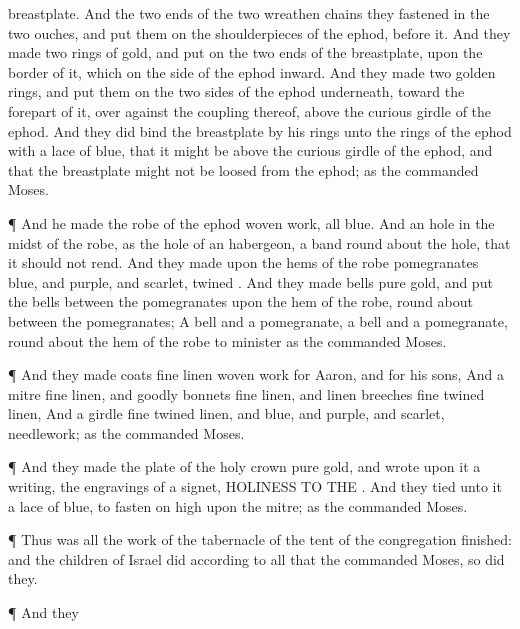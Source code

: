 {breastplate.
And the
two
ends of the
two
wreathen
chains they
fastened in the
two
ouches, and
put them on the
shoulderpieces of the
ephod,
before
it.
And they
made
two
rings of
gold, and
put
{} on the
two
ends of the
breastplate, upon the
border of it, which
{} on the
side of the
ephod
inward.
And they
made
two
{}
golden
rings, and
put them on the
two
sides of the
ephod
underneath,
toward the
forepart of it, over
against the
{}
coupling thereof,
above the curious
girdle of the
ephod.
And they did
bind the
breastplate by his
rings unto the
rings of the
ephod with a
lace of
blue, that it might be above the curious
girdle of the
ephod, and that the
breastplate might not be
loosed from the
ephod; as the
{}
commanded
Moses.
\par }{\PP {}¶ And he
made the
robe of the
ephod
{}
woven
work,
all
{}
blue.
And
{} an
hole in the
midst of the
robe, as the
hole of an
habergeon,
{} a
band round
about the
hole, that it should not
rend.
And they
made upon the
hems of the
robe
pomegranates
{}
blue, and
purple, and
scarlet,
{}
twined
{}.
And they
made
bells
{}
pure
gold, and
put the
bells
between the
pomegranates upon the
hem of the
robe, round
about
between the
pomegranates;
A
bell and a
pomegranate, a
bell and a
pomegranate, round
about the
hem of the
robe to
minister
{} as the
{}
commanded
Moses.
\par }{\PP {}¶ And they
made
coats
{} fine
linen
{}
woven
work for
Aaron, and for his
sons,
And a
mitre
{} fine
linen, and
goodly
bonnets
{} fine
linen, and
linen
breeches
{} fine
twined
linen,
And a
girdle
{} fine
twined
linen, and
blue, and
purple, and
scarlet,
{}
needlework; as the
{}
commanded
Moses.
\par }{\PP {}¶ And they
made the
plate of the
holy
crown
{}
pure
gold, and
wrote upon it a
writing,
{} the
engravings of a
signet,
HOLINESS TO THE
{}.
And they
tied unto it a
lace of
blue, to
fasten
{} on
high upon the
mitre; as the
{}
commanded
Moses.
\par }{\PP {}¶ Thus was all the
work of the
tabernacle of the
tent of the
congregation
finished: and the
children of
Israel
did according to all that the
{}
commanded
Moses, so
did they.
\par }{\PP {}¶ And they
}
